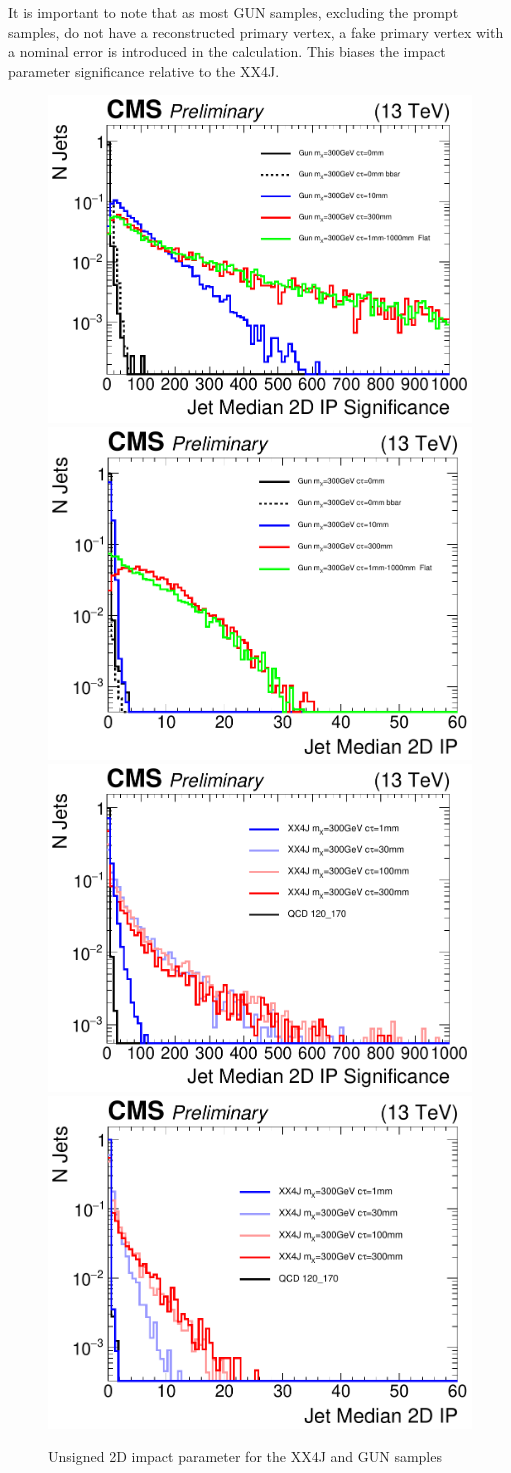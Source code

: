 It is important to note that as most GUN samples, excluding the prompt samples, do not  have a reconstructed primary vertex, a fake primary vertex with a nominal error is introduced in the calculation. This biases the impact parameter significance relative to the XX4J.
\begin{figure}
\begin{center}
\includegraphics[width=.45\textwidth]{figures/an_jetid/VTX_MATCH_IP/GUN_jetMedianIPSig2D}
\includegraphics[width=.45\textwidth]{figures/an_jetid/VTX_MATCH_IP/GUN_jetMedianIP2D}
\includegraphics[width=.45\textwidth]{figures/an_jetid/VTX_MATCH_IP/XX4J_jetMedianIPSig2D}
\includegraphics[width=.45\textwidth]{figures/an_jetid/VTX_MATCH_IP/XX4J_jetMedianIP2D}
\end{center}
\caption{Unsigned 2D impact parameter for the XX4J and GUN samples}
\label{fig:ip_vs_ipsig}
\end{figure}

